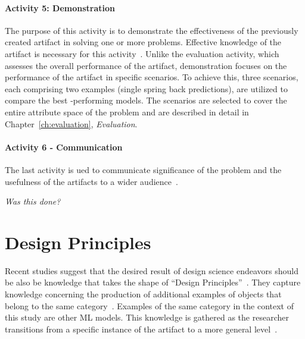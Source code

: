 \paragraph{Activity 5: Demonstration}
The purpose of this activity is to demonstrate the effectiveness of the previously created artifact in solving one or
more problems.
Effective knowledge of the artifact is necessary for this
activity~\cite[p. 55]{peffers_designscienceresearch_2007}.
Unlike the evaluation activity, which assesses the overall performance of the artifact, demonstration focuses on the
performance of the artifact in specific scenarios.
To achieve this, three scenarios, each comprising two examples (single spring back predictions), are utilized to
compare the best -performing models.
The scenarios are selected to cover the entire attribute space of the problem and are described in detail in
Chapter~\ref{ch:evaluation}, \textit{Evaluation}.

\paragraph{Activity 6 - Communication}
The last activity is ued to communicate significance of the problem and the usefulness of the artifacts to a wider
audience~\cite[p. 56]{peffers_designscienceresearch_2007}.

\textit{Was this done?}


\section{Design Principles}\label{sec:design-principles}


Recent studies suggest that the desired result of design science endeavors should be also be knowledge that takes the
shape of
``Design Principles''~\cite{baskerville2010explanatory, sein2011action, gregor_positioningpresentingdesign_2013}.
They capture knowledge concerning the production of additional examples of objects that belong to the same
category~\cite[p. 39]{sein2011action}.
Examples of the same category in the context of this study are other \ac{ML} models.
This knowledge is gathered as the researcher transitions from a specific instance of the
artifact to a more general level~\cite[p. 37]{chandra2016making}.

